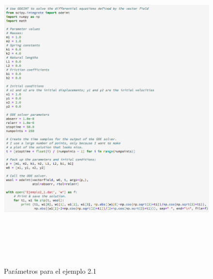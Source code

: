 \begin{figure}
	\begin{center}
		\includegraphics[height=17cm]{Ejem2_1-Para}
        \caption{Parámetros para el ejemplo 2.1}
        \label{Ejem2.1-Para}
    \end{center}
\end{figure}

